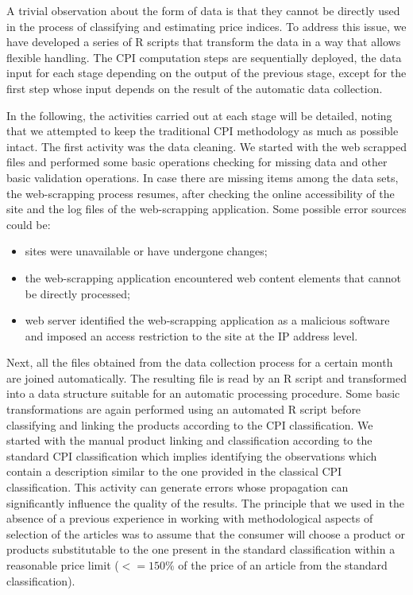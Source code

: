 \documentclass[]{article}
\begin{document}
A trivial observation about the form of data is that they cannot be directly used in the process of classifying 
and estimating price indices. To address this issue, we have developed a series of R scripts that transform 
the data in a way that allows flexible handling. The CPI computation steps are sequentially deployed, the data 
input for each stage depending on the output of the previous stage, except for the first step whose input depends 
on the result of the automatic data collection.



In the following, the activities carried out at each stage will be detailed, noting that we attempted to keep the 
traditional CPI methodology as much as possible intact. The first activity was the data cleaning. We started with 
the web scrapped files and performed some basic operations checking for missing data and other basic validation operations. 
In case there are missing items among the data sets, the web-scrapping process resumes, after checking the online accessibility 
of the site and the log files of the web-scrapping application. Some possible error sources could be: 
\begin{itemize}
	\item sites were unavailable or have undergone changes;
	\item the web-scrapping application encountered web content elements that cannot be directly processed;
	\item web server identified the web-scrapping application as a malicious software and imposed an access restriction to the site at the IP address level.
\end{itemize}


Next, all the files obtained from the data collection process for a certain month are joined automatically. The resulting 
file is read by an R script and transformed into a data structure suitable for an automatic processing procedure. Some 
basic transformations are again performed using an automated R script before classifying and linking the products according 
to the CPI classification. We started with the manual product linking and classification according to the standard CPI 
classification which implies identifying the observations which contain a description similar to the one provided in the
classical CPI classification. This activity can generate errors whose propagation can significantly influence the quality 
of the results. The principle that we used in the absence of a previous experience in working with methodological aspects 
of selection of the articles was to assume that the consumer will choose a product or products substitutable to the one present 
in the standard classification within a reasonable price limit ($<= 150\%$ of the price of an article from the standard classification). 
\end{document}
